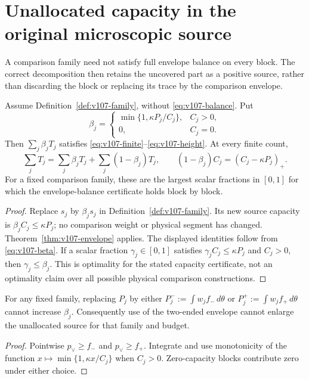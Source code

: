 \section{Unallocated capacity in the original microscopic source}
\label{sec:v107-allocation}
A comparison family need not satisfy full envelope balance on every
block. The correct decomposition then retains the uncovered part
as a positive source, rather than discarding the block or replacing
its trace by the comparison envelope.

\begin{theorem}
\label{thm:v107-allocation}
Assume Definition~\ref{def:v107-family}, without
\eqref{eq:v107-balance}. Put
\begin{equation}\label{eq:v107-beta}
 \beta_j=\begin{cases}
       \min\{1,\kappa P_j/C_j\},&C_j>0,\\
       0,&C_j=0.
       \end{cases}
\end{equation}
Then $\sum_j\beta_jT_j$ satisfies
\eqref{eq:v107-finite}--\eqref{eq:v107-height}. At every finite count,
\begin{equation}\label{eq:v107-exact-block-split}
 \sum_jT_j=\sum_j\beta_jT_j+\sum_j(1-\beta_j)T_j,
 \qquad (1-\beta_j)C_j=(C_j-\kappa P_j)_+.
\end{equation}
For a fixed comparison family, these are the largest scalar
fractions in $[0,1]$ for which the envelope-balance certificate holds
block by block.
\end{theorem}
\begin{proof}
Replace $s_j$ by $\beta_js_j$ in
Definition~\ref{def:v107-family}. Its new source capacity is
$\beta_jC_j\le\kappa P_j$; no comparison weight or physical segment
has changed. Theorem~\ref{thm:v107-envelope} applies. The displayed
identities follow from \eqref{eq:v107-beta}. If a scalar fraction
$\gamma_j\in[0,1]$ satisfies $\gamma_jC_j\le\kappa P_j$ and $C_j>0$,
then $\gamma_j\le\beta_j$. This is optimality for the stated
capacity certificate, not an optimality claim over all possible
physical comparison constructions.
\end{proof}

\begin{corollary}
\label{cor:v107-monotone}
For any fixed family, replacing $P_j$ by either
$P_j^-:=\int w_jf_-\,d\theta$ or
$P_j^+:=\int w_jf_+\,d\theta$ cannot increase $\beta_j$.
Consequently use of the two-ended envelope cannot enlarge the
unallocated source for that family and budget.
\end{corollary}
\begin{proof}
Pointwise $p_\vee\ge f_-$ and $p_\vee\ge f_+$. Integrate and use monotonicity
of the function $x\mapsto\min\{1,\kappa x/C_j\}$ when $C_j>0$.
Zero-capacity blocks contribute zero under either choice.
\end{proof}

